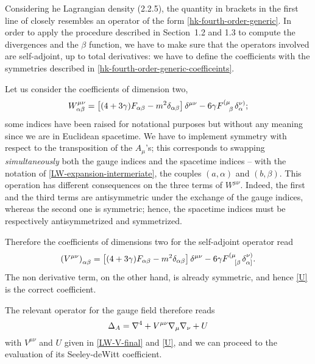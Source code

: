 Considering he Lagrangian density (2.2.5),
the quantity in brackets in the first line of  closely resembles an operator of the form \eqref{hk-fourth-order-generic}. In order to apply the procedure described in Section~1.2 and 1.3 to compute the divergences and the $\beta$ function, we have to make sure that the operators involved are self-adjoint, up to total derivatives: we have to define the coefficients with the symmetries described in \eqref{hk-fourth-order-generic-coefficeints}.


Let us consider the coefficients of dimension two, \ie
\begin{equation}\label{LW-operator-D2-prov-coeffs}
W^{\mu \nu}_{\alpha\beta} =
			\left[
  				(4 + 3 \gamma) F_{ \alpha \beta} 
	  			- m^2 \delta_{\alpha \beta} 
	  			\right] \delta^{\mu\nu}
  				- 6 \gamma F\indices{^{(\mu}_\beta }\delta^{\nu )}_{ \alpha };
\end{equation}
some indices have been raised for notational purposes but without any meaning since we are in Euclidean spacetime. We have to implement symmetry with respect to the transposition  of the \( A_\mu \)'s;  this corresponds to swapping \emph{simultaneously} both the gauge indices and the spacetime indices -- with the notation of  \eqref{LW-expansion-intermeriate}, the couples \( (a,\alpha) \) and \( (b,\beta ) \). This operation has different consequences on the three terms of $W^{\mu \nu} $. Indeed, the first and the third terms are antisymmetric under the exchange of the gauge indices, whereas the second one is symmetric; hence, the spacetime indices must be respectively antisymmetrized and symmetrized.



Therefore the coefficients of dimensions two for the self-adjoint operator read
\begin{equation}\label{LW-V-final}
\left(V^{\mu \nu}\right)_{\alpha \beta}
 	= 
 	\left[
  	(4 + 3 \gamma) F_{ \alpha \beta} 
	- m^2 \delta_{\alpha \beta} 
	\right] \delta^{\mu\nu}
  	- 6 \gamma F\indices{^{(\mu}_{[ \beta } } \delta^{\nu )}_{{ \alpha] } }.
\end{equation}
The non derivative term, on the other hand, is already symmetric, and hence
\eqref{U}
is the correct coefficient.



 The relevant operator for the gauge field therefore reads
\begin{equation}
\Delta_A = { \mathcal{\nabla} }^4 + V^{\mu\nu} { \mathcal{\nabla} }_\mu { \mathcal{\nabla} }_\nu + U
\end{equation}
with $V^{\mu\nu}$ and $U$ given in \eqref{LW-V-final} and \eqref{U}, and we can proceed to the evaluation of its Seeley-deWitt coefficient. 





